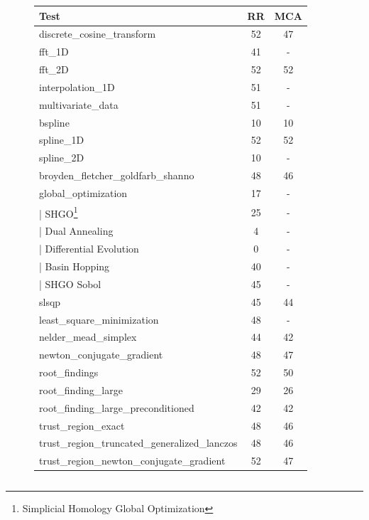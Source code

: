 \documentclass[11pt]{article}
\begin{document}
\begin{table}
\small
\begin{subfigure}[t]{.5\linewidth}
    \centering
    \begin{tabular}{|l|c|c|}
    \hline 
    Test & RR & MCA \\
    \hline
    discrete\_cosine\_transform & 52 & 47 \\ 
    fft\_1D & 41 & - \\
    fft\_2D & 52 & 52  \\
    \hline
    interpolation\_1D & 51 & -   \\
    multivariate\_data & 51 & - \\
    bspline  & 10 & 10  \\
    spline\_1D & 52 & 52 \\
    spline\_2D & 10 & - \\
    \hline
    broyden\_fletcher\_goldfarb\_shanno & 48 & 46 \\
    global\_optimization & 17 & - \\
    | SHGO\footnote{Simplicial Homology Global Optimization} & 25 & - \\
    | Dual Annealing & 4 & - \\
    | Differential Evolution & 0 & - \\
    | Basin Hopping & 40 & - \\
    | SHGO Sobol & 45 & - \\
    slsqp & 45 & 44 \\
    least\_square\_minimization & 48 & -  \\
    nelder\_mead\_simplex  & 44 & 42  \\
    newton\_conjugate\_gradient  & 48 & 47 \\
    root\_findings  & 52 & 50 \\
    root\_finding\_large & 29 & 26   \\
    root\_finding\_large\_preconditioned & 42 & 42 \\
    trust\_region\_exact& 48 & 46  \\
    trust\_region\_truncated\_generalized\_lanczos & 48 & 46  \\
    trust\_region\_newton\_conjugate\_gradient & 52 & 47 \\
    \hline
    \end{tabular}
\end{subfigure}
\hspace{1cm}
\begin{subfigure}[t]{.5\linewidth}
    \begin{tabular}{|l|c|c|}

\end{tabular}
\end{subfigure}
\end{table}
\end{document}
